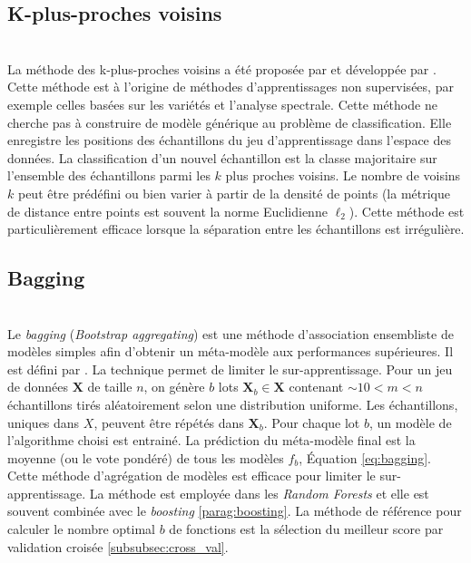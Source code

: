 \subsection{K-plus-proches voisins} \mbox{} \label{parag:knn} \\
La méthode des k-plus-proches voisins a été proposée par \citeauthor{fix_discriminatory_1951} \cite{fix_discriminatory_1951} et développée par \citeauthor{cover_nearest_1967} \cite{cover_nearest_1967}.
Cette méthode est à l'origine de méthodes d'apprentissages non supervisées, par exemple celles basées sur les variétés et l'analyse spectrale.
Cette méthode ne cherche pas à construire de modèle générique au problème de classification.
Elle enregistre les positions des échantillons du jeu d'apprentissage dans l'espace des données.
La classification d'un nouvel échantillon est la classe majoritaire sur l'ensemble des échantillons parmi les $k$ plus proches voisins.
Le nombre de voisins $k$ peut être prédéfini ou bien varier à partir de la densité  de points (la métrique de distance entre points est souvent la norme Euclidienne $\ell_{2}$).
Cette méthode est particulièrement efficace lorsque la séparation entre les échantillons est irrégulière.


\subsection{Bagging}\mbox{\label{parag:bagging}} \\
Le \textit{bagging} (\textit{\emph{B}ootstrap \emph{agg}regat\emph{ing}}) est une méthode d'association ensembliste de modèles simples afin d'obtenir un méta-modèle aux performances supérieures.
Il est défini par \citeauthor{breiman_bagging_1996} \cite{breiman_bagging_1996}.
La technique permet de limiter le sur-apprentissage.
Pour un jeu de données $\mathbf{X}$ de taille $n$, on génère $b$ lots $\mathbf{X}_b \in \mathbf{X}$ contenant $\sim 10 < m < n$ échantillons tirés aléatoirement selon une distribution uniforme.
Les échantillons, uniques dans $X$, peuvent être répétés dans $\mathbf{X}_b$.
Pour chaque lot $b$, un modèle de l'algorithme choisi est entrainé.
La prédiction du méta-modèle final est la moyenne (ou le vote pondéré) de tous les modèles $f_b$, Équation \ref{eq:bagging}.
Cette méthode d'agrégation de modèles est efficace pour limiter le sur-apprentissage.
La méthode est employée dans les \textit{Random Forests} et elle est souvent combinée avec le \textit{boosting} \ref{parag:boosting}.
La méthode de référence pour calculer le nombre optimal $b$ de fonctions est la sélection du meilleur score par validation croisée \ref{subsubsec:cross_val}.

